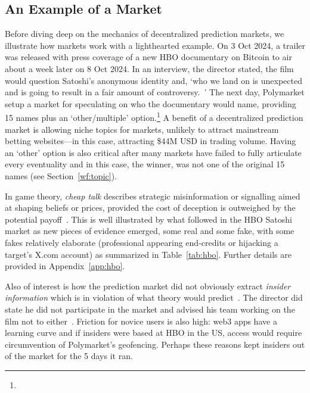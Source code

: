 \subsection{An Example of a Market}
\label{sec:hbo}

Before diving deep on the mechanics of decentralized prediction markets, we illustrate how markets work with a lighthearted example. On 3 Oct 2024, a trailer was released with press coverage of a new HBO documentary on Bitcoin to air about a week later on 8 Oct 2024. In an interview, the director stated, the film would question Satoshi's anonymous identity and, `who we land on is unexpected and is going to result in a fair amount of controversy.~\cite{Bec24}' The next day, Polymarket setup a market for speculating on who the documentary would name, providing 15 names plus an `other/multiple' option.\footnote{} A benefit of a decentralized prediction market is allowing niche topics for markets, unlikely to attract mainstream betting websites---in this case, attracting \$44M USD in trading volume. Having an `other' option is also critical after many markets have failed to fully articulate every eventuality and in this case, the winner, was not one of the original 15 names (see Section~\ref{wf:topic}).

In game theory, \textit{cheap talk} describes strategic misinformation or signalling aimed at shaping beliefs or prices, provided the cost of deception is outweighed by the potential payoff~\cite{CrSo82}. This is well illustrated by what followed in the HBO Satoshi market as new pieces of evidence emerged, some real and some fake, with some fakes relatively elaborate (professional appearing end-credits or hijacking a target's X.com account) as summarized in Table~\ref{tab:hbo}. Further details are provided in Appendix~\ref{app:hbo}.

Also of interest is how the prediction market did not obviously extract \textit{insider information} which is in violation of what theory would predict~\cite{Han07}. The director did state he did not participate in the market and advised his team working on the film not to either~\cite{Beg24}. Friction for novice users is also high: web3 apps have a learning curve and if insiders were based at HBO in the US, access would require circumvention of Polymarket's geofencing. Perhaps these reasons kept insiders out of the market for the 5 days it ran. %

